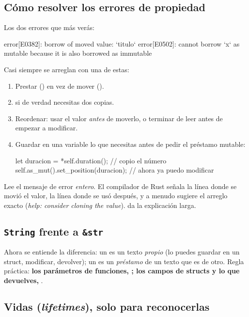 \subsection{Cómo resolver los errores de propiedad}

Los dos errores que más verás:

\begin{terminal}
error[E0382]: borrow of moved value: `titulo`
error[E0502]: cannot borrow `x` as mutable because it is also borrowed as immutable
\end{terminal}

Casi siempre se arreglan con una de estas:

\begin{enumerate}
  \item Prestar () en vez de mover ().
  \item {} si de verdad necesitas dos copias.
  \item Reordenar: usar el valor \emph{antes} de moverlo, o terminar de leer antes de empezar a
  modificar.
  \item Guardar en una variable lo que necesitas antes de pedir el préstamo mutable:
\begin{rust}
let duracion = *self.duration();        // copio el número
self.as_mut().set_position(duracion);   // ahora ya puedo modificar
\end{rust}
\end{enumerate}

\begin{idea}
Lee el mensaje de error \emph{entero}. El compilador de Rust señala la línea donde se movió el
valor, la línea donde se usó después, y a menudo sugiere el arreglo exacto
(\emph{help: consider cloning the value}).  da la explicación larga.
\end{idea}

\subsection{\texttt{String} frente a \texttt{\&str}}

Ahora se entiende la diferencia: un  es un texto \emph{propio} (lo puedes guardar
en un struct, modificar, devolver); un  es un \emph{préstamo} de un texto que es de
otro. Regla práctica: \textbf{los parámetros de funciones, ; los campos de structs y
lo que devuelves, }.

\subsection{Vidas (\emph{lifetimes}), solo para reconocerlas}

